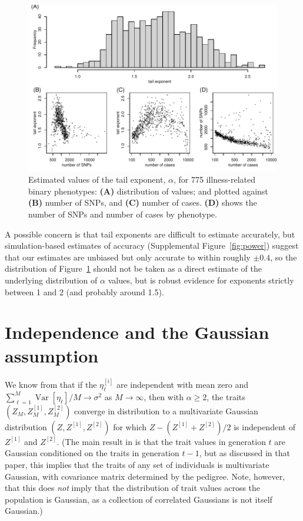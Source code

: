 \documentclass{article}
\newcommand{\var}{\mathop{\mbox{Var}}}
\newcommand{\1}{\mathbbm{1}}
\theoremstyle{remark}
\theoremstyle{definition}
\begin{document}
\begin{figure}
    \begin{center}
    \includegraphics{snp_effects/results_10}
    \end{center}
    \caption{
        Estimated values of the tail exponent, $\alpha$,
        for 775 illness-related binary phenotypes:
        \textbf{(A)} distribution of values; and plotted against
        \textbf{(B)} number of SNPs, and
        \textbf{(C)} number of cases.
        \textbf{(D)} shows the number of SNPs and number of cases by phenotype.
        \label{fig:exponent_hist}
    }
\end{figure}

A possible concern is that tail exponents are difficult to estimate accurately, 
but simulation-based estimates of accuracy (Supplemental Figure~\ref{fig:power})
suggest that our estimates are unbiased but only accurate to within roughly $\pm 0.4$,
so the distribution of Figure~\ref{fig:exponent_hist} should not be taken as
a direct estimate of the underlying distribution of $\alpha$ values,
but is robust evidence for exponents strictly between 1 and 2 (and probably around 1.5).

\section{Independence and the Gaussian assumption}

We know from \citet{barton2017infinitesimal}  
that if the $\eta^{[i]}_\ell$ are
independent with mean zero and $\sum_{\ell=1}^M \var[\eta_\ell]/M \to \sigma^2$ as $M \to \infty$,
then with $\alpha \ge 2$,
the traits $(Z_M, Z_M^{[1]}, Z_M^{[2]})$ converge in distribution to a multivariate Gaussian distribution
$(Z, Z^{[1]}, Z^{[2]})$ for which $Z - (Z^{[1]} + Z^{[2]})/2$ is independent of $Z^{[1]}$ and $Z^{[2]}$.
(The main result in \citet{barton2017infinitesimal} is that the trait values in generation $t$
are Gaussian conditioned on the traits in generation $t-1$,
but as discussed in that paper,
this implies that the traits of any set of individuals is multivariate Gaussian,
with covariance matrix determined by the pedigree.
Note, however, that this does \emph{not} imply that the distribution of trait values
across the population is Gaussian, as a collection of correlated Gaussians is not itself Gaussian.)
\end{document}
